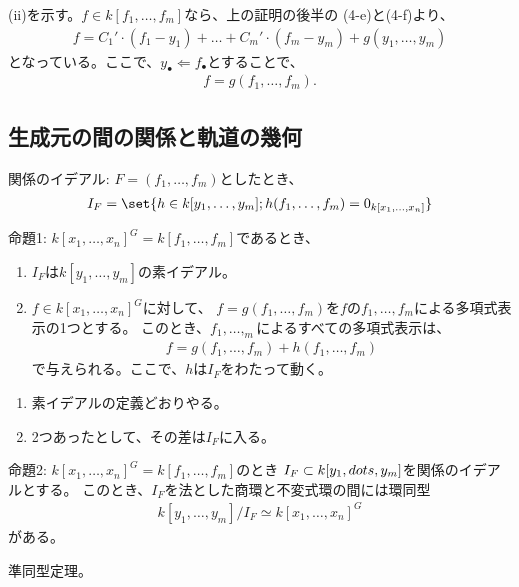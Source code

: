 \begin{myproof}
  (ii)を示す。$f\in k[f_1,\dots,f_m]$なら、上の証明の後半の
  (4-e)と(4-f)より、
  \begin{align}
    f = C_1' \cdot (f_1-y_1) + \dots + C_m'\cdot (f_m-y_m) + g(y_1,\dots,y_m)
  \end{align}
  となっている。ここで、$y_\bullet \Leftarrow f_\bullet$とすることで、
  \begin{align}
    f = g(f_1,\dots,f_m).
  \end{align}

\end{myproof}

\subsection{生成元の間の関係と軌道の幾何}
\label{sub:生成元の間の関係と軌道の幾何}

\begin{framed}
  関係のイデアル:
  $F=(f_1,\dots,f_m)$としたとき、
  \begin{align}
    I_F = \set{h\in k[y_1,\dots,y_m]; h(f_1,\dots,f_m) = 0_{k[x_1,\dots,x_n]}}
  \end{align}
\end{framed}

\begin{framed}
  命題1:
  $k[x_1,\dots,x_n]^G = k[f_1,\dots,f_m]$であるとき、
  \begin{enumerate}[label=(\roman*)]
    \item $I_F$は$k[y_1,\dots,y_m]$の素イデアル。
    \item $f\in k[x_1,\dots,x_n]^G$に対して、
    $f=g(f_1,\dots,f_m)$を$f$の$f_1,\dots,f_m$による多項式表示の1つとする。
    このとき、$f_1,\dots,_m$によるすべての多項式表示は、
    \begin{align}
      f=g(f_1,\dots,f_m) + h(f_1,\dots,f_m)
    \end{align}
    で与えられる。ここで、$h$は$I_F$をわたって動く。
  \end{enumerate}
\end{framed}
\begin{myproof}
  \begin{enumerate}[label=(\arabic*)]
    \item 素イデアルの定義どおりやる。
    \item 2つあったとして、その差は$I_F$に入る。
  \end{enumerate}
\end{myproof}

\begin{framed}
  命題2:
  $k[x_1,\dots,x_n]^G = k[f_1,\dots,f_m]$のとき
  $I_F \subset k[y_1,\\dots,y_m]$を関係のイデアルとする。
  このとき、$I_F$を法とした商環と不変式環の間には環同型
  \begin{align}
    k[y_1,\dots,y_m]/I_F \simeq k[x_1,\dots,x_n]^G
  \end{align}
  がある。
\end{framed}
\begin{myproof}
  準同型定理。
\end{myproof}


